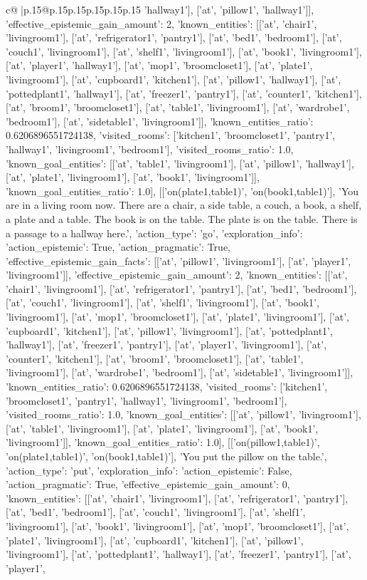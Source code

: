 \documentclass{article}
\begin{document}
{\begin{supertabular}{c@{$\;$}|p{.15\linewidth}@{}p{.15\linewidth}p{.15\linewidth}p{.15\linewidth}p{.15\linewidth}p{.15\linewidth}}
{{{'hallway1'], ['at', 'pillow1', 'hallway1']], 'effective_epistemic_gain_amount': 2, 'known_entities': [['at', 'chair1', 'livingroom1'], ['at', 'refrigerator1', 'pantry1'], ['at', 'bed1', 'bedroom1'], ['at', 'couch1', 'livingroom1'], ['at', 'shelf1', 'livingroom1'], ['at', 'book1', 'livingroom1'], ['at', 'player1', 'hallway1'], ['at', 'mop1', 'broomcloset1'], ['at', 'plate1', 'livingroom1'], ['at', 'cupboard1', 'kitchen1'], ['at', 'pillow1', 'hallway1'], ['at', 'pottedplant1', 'hallway1'], ['at', 'freezer1', 'pantry1'], ['at', 'counter1', 'kitchen1'], ['at', 'broom1', 'broomcloset1'], ['at', 'table1', 'livingroom1'], ['at', 'wardrobe1', 'bedroom1'], ['at', 'sidetable1', 'livingroom1']], 'known_entities_ratio': 0.6206896551724138, 'visited_rooms': ['kitchen1', 'broomcloset1', 'pantry1', 'hallway1', 'livingroom1', 'bedroom1'], 'visited_rooms_ratio': 1.0, 'known_goal_entities': [['at', 'table1', 'livingroom1'], ['at', 'pillow1', 'hallway1'], ['at', 'plate1', 'livingroom1'], ['at', 'book1', 'livingroom1']], 'known_goal_entities_ratio': 1.0}}], [['on(plate1,table1)', 'on(book1,table1)'], 'You are in a living room now. There are a chair, a side table, a couch, a book, a shelf, a plate and a table. The book is on the table. The plate is on the table. There is a passage to a hallway here.', {'action_type': 'go', 'exploration_info': {'action_epistemic': True, 'action_pragmatic': True, 'effective_epistemic_gain_facts': [['at', 'pillow1', 'livingroom1'], ['at', 'player1', 'livingroom1']], 'effective_epistemic_gain_amount': 2, 'known_entities': [['at', 'chair1', 'livingroom1'], ['at', 'refrigerator1', 'pantry1'], ['at', 'bed1', 'bedroom1'], ['at', 'couch1', 'livingroom1'], ['at', 'shelf1', 'livingroom1'], ['at', 'book1', 'livingroom1'], ['at', 'mop1', 'broomcloset1'], ['at', 'plate1', 'livingroom1'], ['at', 'cupboard1', 'kitchen1'], ['at', 'pillow1', 'livingroom1'], ['at', 'pottedplant1', 'hallway1'], ['at', 'freezer1', 'pantry1'], ['at', 'player1', 'livingroom1'], ['at', 'counter1', 'kitchen1'], ['at', 'broom1', 'broomcloset1'], ['at', 'table1', 'livingroom1'], ['at', 'wardrobe1', 'bedroom1'], ['at', 'sidetable1', 'livingroom1']], 'known_entities_ratio': 0.6206896551724138, 'visited_rooms': ['kitchen1', 'broomcloset1', 'pantry1', 'hallway1', 'livingroom1', 'bedroom1'], 'visited_rooms_ratio': 1.0, 'known_goal_entities': [['at', 'pillow1', 'livingroom1'], ['at', 'table1', 'livingroom1'], ['at', 'plate1', 'livingroom1'], ['at', 'book1', 'livingroom1']], 'known_goal_entities_ratio': 1.0}}], [['on(pillow1,table1)', 'on(plate1,table1)', 'on(book1,table1)'], 'You put the pillow on the table.', {'action_type': 'put', 'exploration_info': {'action_epistemic': False, 'action_pragmatic': True, 'effective_epistemic_gain_amount': 0, 'known_entities': [['at', 'chair1', 'livingroom1'], ['at', 'refrigerator1', 'pantry1'], ['at', 'bed1', 'bedroom1'], ['at', 'couch1', 'livingroom1'], ['at', 'shelf1', 'livingroom1'], ['at', 'book1', 'livingroom1'], ['at', 'mop1', 'broomcloset1'], ['at', 'plate1', 'livingroom1'], ['at', 'cupboard1', 'kitchen1'], ['at', 'pillow1', 'livingroom1'], ['at', 'pottedplant1', 'hallway1'], ['at', 'freezer1', 'pantry1'], ['at', 'player1', }}}
\end{supertabular}}
\end{document}
